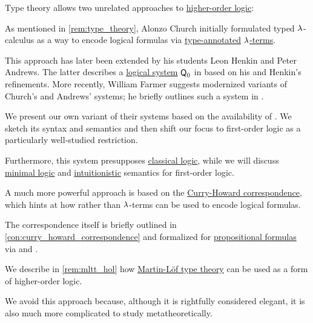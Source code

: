 \begin{remark}\label{rem:higher_order_logic_and_type_theory}
  Type theory allows two unrelated approaches to \hyperref[rem:predicate_logic]{higher-order logic}:
  \begin{thmenum}
     As mentioned in \cref{rem:type_theory}, Alonzo Church initially formulated typed \( {\mathrm \lambda} \)-calculus as a way to encode logical formulas via \hyperref[con:type_annotation]{type-annotated} \hyperref[def:lambda_term]{\( {\mathrm \lambda} \)-terms}.

    This approach has later been extended by his students Leon Henkin and Peter Andrews. The latter describes a \hyperref[con:logical_system]{logical system} \( \textsf{Q}_0 \) in \cite[ch. 5]{Andrews2002Logic} based on his and Henkin's refinements. More recently, William Farmer suggests modernized variants of Church's and Andrews' systems; he briefly outlines such a system in \cite{Farmer2008STTVirtues}.

    We present our own variant of their systems based on the availability of . We sketch its syntax and semantics and then shift our focus to first-order logic as a particularly well-studied restriction.

    Furthermore, this system presupposes \hyperref[con:classical_logic]{classical logic}, while we will discuss \hyperref[con:minimal_logic]{minimal logic} and \hyperref[con:intuitionistic_logic]{intuitionistic} semantics for first-order logic.

     A much more powerful approach is based on the \hyperref[con:curry_howard_correspondence]{Curry-Howard correspondence}, which hints at how  rather than \( {\mathrm \lambda} \)-terms can be used to encode logical formulas.

    The correspondence itself is briefly outlined in \cref{con:curry_howard_correspondence} and formalized for \hyperref[def:propositional_syntax/formula]{propositional formulas} via  and .

    We describe in \cref{rem:mltt_hol} how \hyperref[def:mltt]{Martin-L\"of type theory} can be used as a form of higher-order logic.

    We avoid this approach because, although it is rightfully considered elegant, it is also much more complicated to study metatheoretically.
  \end{thmenum}
\end{remark}

